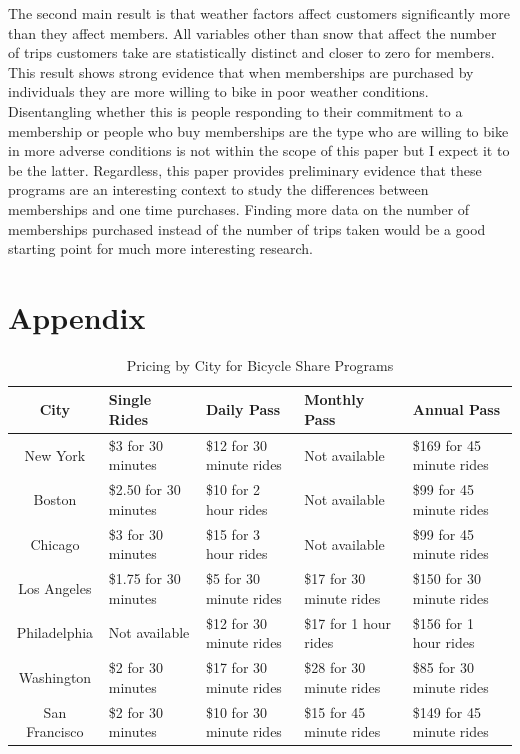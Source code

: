 \documentclass[12pt,letter paper]{article}
\begin{document}
The second main result is that weather factors affect customers significantly more than they affect members.  All variables other than snow that affect the number of trips customers take are statistically distinct and closer to zero for members.  This result shows strong evidence that when memberships are purchased by individuals they are more willing to bike in poor weather conditions.  Disentangling whether this is people responding to their commitment to a membership or people who buy memberships are the type who are willing to bike in more adverse conditions is not within the scope of this paper but I expect it to be the latter.  Regardless, this paper provides preliminary evidence that these programs are an interesting context to study the differences between memberships and one time purchases.  Finding more data on the number of memberships purchased instead of the number of trips taken would be a good starting point for much more interesting research.






\appendix
{}
\section{Appendix}
\begin{table}[H]
\begin{tabular}{| c | p{2.5cm} | p{2.5cm}  | p{2.5cm}  | p{2.5cm}  | }
\hline
City & Single Rides & Daily Pass & Monthly Pass & Annual Pass \\
\hline
New York & \$3 for 30 minutes & \$12 for 30 minute rides & Not available & \$169 for 45 minute rides \\
\hline
Boston & \$2.50 for 30 minutes & \$10 for 2 hour rides & Not available & \$99 for 45 minute rides \\
\hline
Chicago & \$3 for 30 minutes & \$15 for 3 hour rides & Not available & \$99 for 45 minute rides \\
\hline
Los Angeles & \$1.75 for 30 minutes & \$5 for 30 minute rides & \$17 for 30 minute rides & \$150 for 30 minute rides \\
\hline
Philadelphia & Not available & \$12 for 30 minute rides & \$17 for 1 hour rides & \$156 for 1 hour rides \\
\hline
Washington & \$2 for 30 minutes & \$17 for 30 minute rides & \$28 for 30 minute rides & \$85 for 30 minute rides \\
\hline
San Francisco & \$2 for 30 minutes & \$10 for 30 minute rides & \$15 for 45 minute rides & \$149 for 45 minute rides \\
\hline 
\end{tabular}
\caption{Pricing by City for Bicycle Share Programs}
\end{table}
\end{document}
